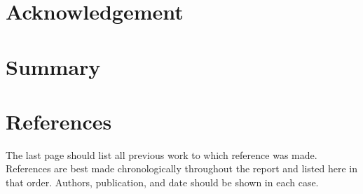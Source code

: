 
\titleGM
\pagestyle{empty}

\clearpage


\doublespacing
\section*{Acknowledgement}
\newpage

\section*{Summary}
\newpage

\pagestyle{plain}
\setcounter{page}{1}
\tableofcontents
\newpage

\listoffigures
\newpage

\listoftables
\newpage

\setcounter{page}{1}




\newpage


\newpage


\newpage

\section*{References}
The last page should list all previous work to which reference was made.
References are best made chronologically throughout the report and listed here in that order.
Authors, publication, and date should be shown in each case.
